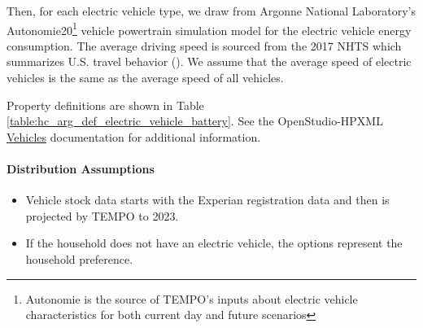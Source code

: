 Then, for each electric vehicle type, we draw from Argonne National Laboratory's Autonomie20\footnote{Autonomie is the source of TEMPO's inputs about electric vehicle characteristics for both current day and future scenarios} vehicle powertrain simulation model for the electric vehicle energy consumption. The average driving speed is sourced from the 2017 NHTS which summarizes U.S. travel behavior (\cite{NHTS2017}). We assume that the average speed of electric vehicles is the same as the average speed of all vehicles.

Property definitions are shown in Table \ref{table:hc_arg_def_electric_vehicle_battery}. See the OpenStudio-HPXML \href{https://openstudio-hpxml.readthedocs.io/en/v1.10.0/workflow_inputs.html#hpxml-vehicles}{Vehicles} documentation for additional information.



\paragraph{Distribution Assumptions}
% 
\begin{itemize}
  \item Vehicle stock data starts with the Experian registration data and then is projected by TEMPO to 2023.
  \item If the household does not have an electric vehicle, the options represent the household preference.
\end{itemize}
